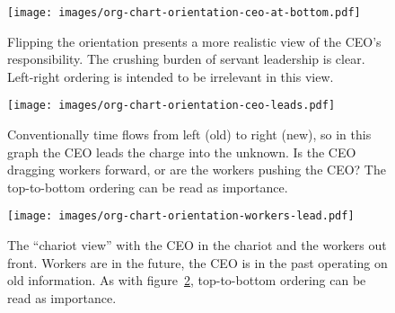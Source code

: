 \begin{figure}
\texttt{[image: images/org-chart-orientation-ceo-at-bottom.pdf]}
\caption{Flipping the orientation presents a more realistic view of the CEO's responsibility. The crushing burden of servant leadership is clear. Left-right ordering is intended to be irrelevant in this view.}
\label{org_chart_orientation_ceo-at-bottom}
\end{figure}

\begin{figure}
\texttt{[image: images/org-chart-orientation-ceo-leads.pdf]}
\caption{Conventionally time flows from left (old) to right (new), so in this graph the CEO leads the charge into the unknown. Is the CEO dragging workers forward, or are the workers pushing the CEO? The top-to-bottom ordering can be read as importance. }
\label{org_chart_orientation_ceo-leads}
\end{figure}

\begin{figure}
\texttt{[image: images/org-chart-orientation-workers-lead.pdf]}
\caption{The ``chariot view'' with the CEO in the chariot and the workers out front. Workers are in the future, the CEO is in the past operating on old information. As with figure~\ref{org_chart_orientation_ceo-leads}, top-to-bottom ordering can be read as importance. }
\label{org_chart_orientation_ceo-follows}
\end{figure}




